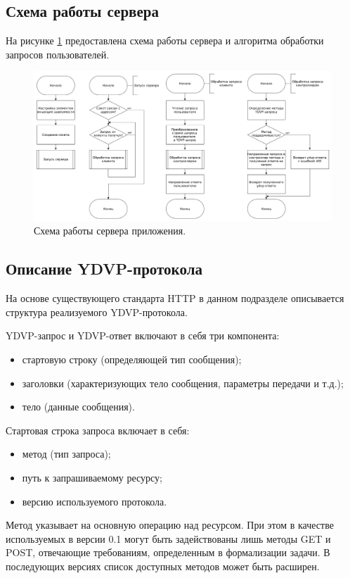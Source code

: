 \subsection{Схема работы сервера}
На рисунке \ref{fig:serverScheme} предоставлена схема работы сервера и алгоритма обработки запросов пользователей.

\begin{figure}[hbtp]
	\centering
	\includegraphics[width=\textwidth]{img/serverScheme.png}
	\caption{Схема работы сервера приложения. }
	\label{fig:serverScheme}
\end{figure}

\subsection{Описание YDVP-протокола}
На основе существующего стандарта HTTP в данном подразделе описывается структура реализуемого YDVP-протокола.

YDVP-запрос и YDVP-ответ включают в себя три компонента:
\begin{itemize}[leftmargin=1.6\parindent]
\item стартовую строку (определяющей тип сообщения);
\item заголовки (характеризующих тело сообщения, параметры передачи и т.д.);
\item тело (данные сообщения).
\end{itemize}

Стартовая строка запроса включает в себя:
\begin{itemize}[leftmargin=1.6\parindent]
\item метод (тип запроса);
\item путь к запрашиваемому ресурсу;
\item версию используемого протокола.
\end{itemize}

Метод указывает на основную операцию над ресурсом. При этом в качестве используемых в версии 0.1 могут быть задействованы лишь методы GET и POST, отвечающие требованиям, определенным в формализации задачи. В последующих версиях список доступных методов может быть расширен.


